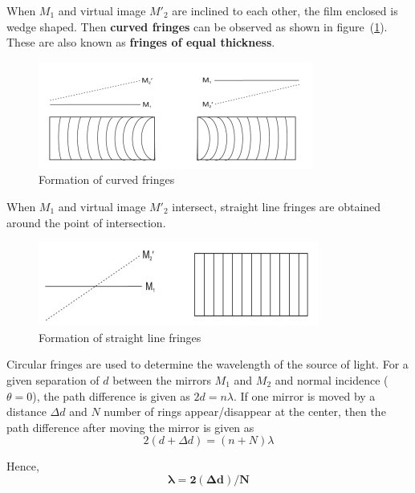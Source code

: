 \documentclass{article}
\begin{document}
\par
\noindent
When $M_1$ and virtual image $M'_2$ are inclined to each other, the film enclosed is wedge shaped. Then \textbf{curved fringes} can be observed as shown in figure~(\ref{fig:curved_fringes}). These are also known as \textbf{fringes of equal thickness}.
\begin{figure}[h!]
    \centering
    \includegraphics{Figures/form. of curved fring.png}
    \caption{Formation of curved fringes}
    \label{fig:curved_fringes}
\end{figure}
\par
\noindent
When $M_1$ and virtual image $M'_2$ intersect, straight line fringes are obtained around the point of intersection.
\begin{figure}[h!]
    \centering
    \includegraphics{Figures/form of strg lin fring.png}
    \caption{Formation of straight line fringes}
    \label{fig:straight_fringes}
\end{figure}
\par
\noindent
Circular fringes are used to determine the wavelength of the source of light. For a given separation of $d$ between the mirrors $M_1$ and $M_2$ and normal incidence ($\theta = 0$), the path 
difference is given as $2d = n \lambda$. If one mirror is moved by a distance $\Delta d$ and $N$ number of rings appear/disappear at the center, then the path difference after moving the mirror is given as
\begin{equation}
\label{eq00}
    2(d + \Delta d) = (n + N) \lambda
\end{equation}
\par
\noindent
Hence, 
\begin{equation}
    \boxed{\mathbf{\lambda = 2 (\Delta d)/ N}}
\end{equation}
\end{document}
